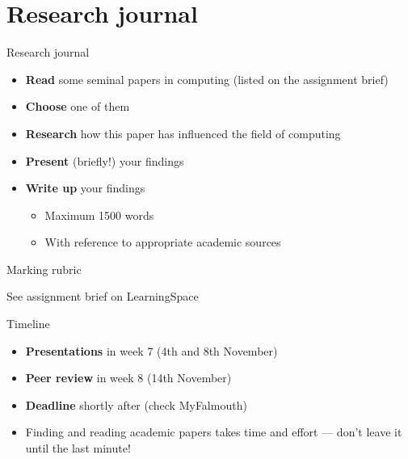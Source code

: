 \part{Research journal}
\frame{\partpage}

\begin{frame}{Research journal}
    \begin{itemize}
        \pause\item \textbf{Read} some seminal papers in computing (listed on the assignment brief)
        \pause\item \textbf{Choose} one of them
        \pause\item \textbf{Research} how this paper has influenced the field of computing
		\pause\item \textbf{Present} (briefly!) your findings
        \pause\item \textbf{Write up} your findings
        \begin{itemize}
            \pause\item Maximum 1500 words
            \pause\item With reference to appropriate academic sources
        \end{itemize}
    \end{itemize}
\end{frame}

\begin{frame}{Marking rubric}
    \begin{center}
        See assignment brief on LearningSpace
    \end{center}
\end{frame}

\begin{frame}{Timeline}
    \begin{itemize}
        \pause\item \textbf{Presentations} in week 7 (4th and 8th November)
        \pause\item \textbf{Peer review} in week 8 (14th November)
        \pause\item \textbf{Deadline} shortly after (check MyFalmouth)
        \pause\item Finding and reading academic papers takes time and effort --- don't leave it until the last minute!
    \end{itemize}
\end{frame}

